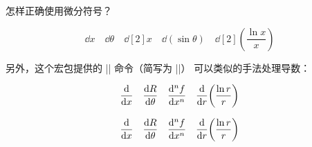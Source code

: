 \begin{myQA}{怎样正确使用微分符号？}
\begin{myExampleH}
\begin{equation*}
    \dd x \quad
    \dd{\theta} \quad
    \dd[2]{x} \quad
    \dd(\sin \theta) \quad
    \dd[2](\frac{\ln x}{x})
\end{equation*}
\end{myExampleH}

另外，这个宏包提供的 \code|\derivative| 命令（简写为 \code|\dv|）
可以类似的手法处理导数：
\begin{myExampleH}
{\begin{equation*}
	\dv{x} \quad \dv{R}{\theta} \quad \dv[n]{f}{x} \quad
	\dv{r}(\frac{\ln r}{r})
\end{equation*}}
\usepackage{physics}

\begin{equation*}
    \dv{x} \quad
    \dv{R}{\theta} \quad
    \dv[n]{f}{x} \quad
    \dv{r}(\frac{\ln r}{r})
\end{equation*}
\end{myExampleH}

\end{myQA}

